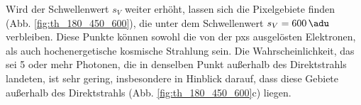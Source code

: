 %     
%     
%     
\noindent
Wird der Schwellenwert $s_V$ weiter erhöht, lassen sich die Pixelgebiete finden (Abb. \ref{fig:th_180_450_600}), die unter dem Schwellenwert $s_V = \SI{600}{\adu}$ verbleiben. Diese Punkte können sowohl die von der \gls{pxs} ausgelösten Elektronen, als auch hochenergetische kosmische Strahlung sein. Die Wahrscheinlichkeit, das sei 5 oder mehr Photonen, die in denselben Punkt außerhalb des Direktstrahls landeten, ist sehr gering, insbesondere in Hinblick darauf, dass diese Gebiete außerhalb des Direktstrahls (Abb. \ref{fig:th_180_450_600}c) liegen.
%     
